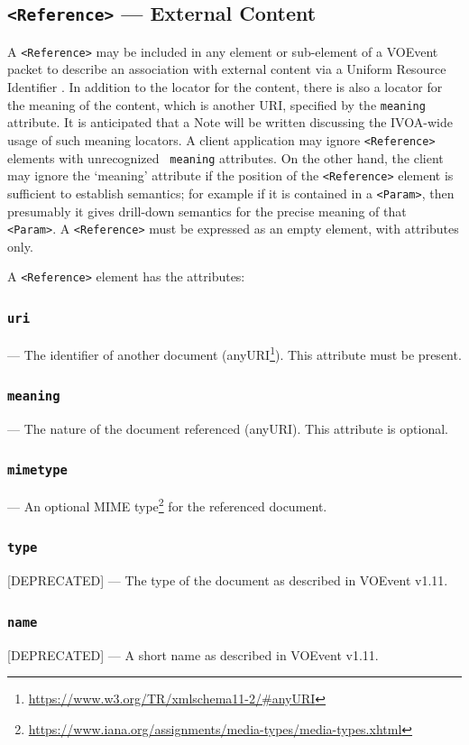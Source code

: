\documentclass[11pt,a4paper]{ivoa}
\begin{document}
\subsection{{\tt <Reference>} --- External Content}
\label{sec:3.9}
A {\tt <Reference>} may be included in any element or sub-element of a VOEvent 
packet to describe an association with external content via a Uniform Resource 
Identifier \citep{2016ivoa.spec.0523D}. In addition to the locator for the 
content, there is also a locator for the meaning of the content, which is 
another URI, specified by the {\tt meaning} attribute. It is anticipated that a 
Note will be written discussing the IVOA-wide usage of such meaning locators. A 
client application may ignore {\tt <Reference>} elements with unrecognized {\tt 
meaning} attributes. On the other hand, the client may ignore the `meaning' 
attribute if the position of the {\tt <Reference>} element is sufficient to 
establish semantics; for example if it is contained in a {\tt <Param>}, then 
presumably it gives drill-down semantics for the precise meaning of that {\tt 
<Param>}. A {\tt <Reference>} must be expressed as an empty element, with 
attributes only. 

A {\tt <Reference>} element has the attributes: 
\subsubsection{\tt uri}\label{sec:3.9.1}--- The identifier of another document 
(anyURI\footnote{\url{https://www.w3.org/TR/xmlschema11-2/\#anyURI}}). This 
attribute must be present. 
\subsubsection{\tt meaning}\label{sec:3.9.2}--- The nature of the document 
referenced (anyURI). This attribute is optional. 
\subsubsection{\tt mimetype}\label{sec:3.9.3}--- An optional MIME type\footnote{
\url{https://www.iana.org/assignments/media-types/media-types.xhtml}} for the 
referenced document. 
\subsubsection{\tt type}\label{sec:3.9.4}[DEPRECATED] --- The type of the 
document as described in VOEvent v1.11. 
\subsubsection{\tt name}\label{sec:3.9.5}[DEPRECATED] --- A short name as 
described in VOEvent v1.11. 
\end{document}
